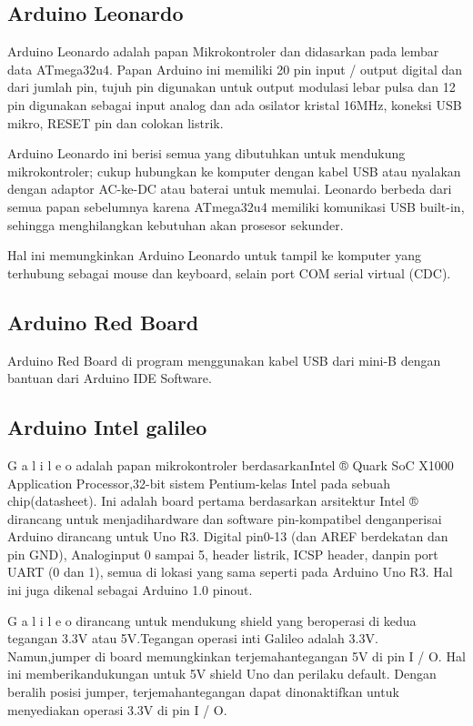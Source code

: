 \subsection {Arduino Leonardo}
Arduino Leonardo adalah papan Mikrokontroler dan didasarkan pada lembar data ATmega32u4. 
Papan Arduino ini memiliki 20 pin input / output digital dan dari jumlah pin, tujuh pin digunakan untuk output modulasi lebar pulsa dan 12 pin digunakan sebagai input analog dan ada osilator kristal 16MHz, koneksi USB mikro, RESET pin dan colokan listrik.

Arduino Leonardo ini berisi semua yang dibutuhkan untuk mendukung mikrokontroler; cukup hubungkan ke komputer dengan kabel USB atau nyalakan dengan adaptor AC-ke-DC atau baterai untuk memulai. 
Leonardo berbeda dari semua papan sebelumnya karena ATmega32u4 memiliki komunikasi USB built-in, sehingga menghilangkan kebutuhan akan prosesor sekunder.

Hal ini memungkinkan Arduino Leonardo untuk tampil ke komputer yang terhubung sebagai mouse dan keyboard, selain port COM serial virtual (CDC).

\subsection{Arduino Red Board}
Arduino Red Board di program menggunakan kabel USB dari mini-B dengan bantuan dari Arduino IDE Software.

\subsection{Arduino Intel galileo}
G a l i l e o adalah papan mikrokontroler berdasarkanIntel ® Quark SoC X1000 Application Processor,32-bit sistem Pentium-kelas Intel pada sebuah chip(datasheet). Ini adalah board pertama berdasarkan arsitektur Intel ® dirancang untuk menjadihardware dan software pin-kompatibel denganperisai Arduino dirancang untuk Uno R3. Digital pin0-13 (dan AREF berdekatan dan pin GND), Analoginput 0 sampai 5, header listrik, ICSP header, danpin port UART (0 dan 1), semua di lokasi yang sama seperti pada Arduino Uno R3. Hal ini juga dikenal sebagai Arduino 1.0 pinout. 

G a l i l e o dirancang untuk mendukung shield yang beroperasi di kedua tegangan  3.3V atau 5V.Tegangan operasi inti Galileo adalah 3.3V. Namun,jumper di board memungkinkan terjemahantegangan 5V di pin I / O. Hal ini memberikandukungan untuk 5V shield Uno dan perilaku default. Dengan beralih posisi jumper, terjemahantegangan dapat dinonaktifkan untuk menyediakan operasi 3.3V di pin I / O. 

